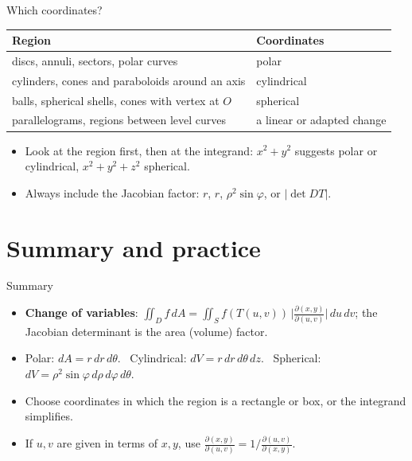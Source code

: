 \documentclass[10pt]{wosm-slides}
\newcommand{\dA}{\, dA}
\begin{document}
\begin{frame}{Which coordinates?}
  \begin{center}
    \begin{tabular}{@{}ll@{}}
      \toprule
      Region & Coordinates \\
      \midrule
      discs, annuli, sectors, polar curves & polar \\
      cylinders, cones and paraboloids around an axis & cylindrical \\
      balls, spherical shells, cones with vertex at $O$ & spherical \\
      parallelograms, regions between level curves & a linear or adapted change \\
      \bottomrule
    \end{tabular}
  \end{center}
  \pause
  \begin{itemize}
    \item Look at the region first, then at the integrand: $x^2 + y^2$ suggests polar or cylindrical,
      $x^2 + y^2 + z^2$ spherical.
    \item Always include the Jacobian factor: $r$, $r$, $\rho^2\sin\varphi$, or $|\det DT|$.
  \end{itemize}
\end{frame}

\section{Summary and practice}

\begin{frame}{Summary}
  \begin{itemize}
    \item \textbf{Change of variables}: $\iint_D f \dA = \iint_S f(T(u, v))\,
      \bigl|\frac{\partial(x, y)}{\partial(u, v)}\bigr|\, du\, dv$; the Jacobian determinant is the area
      (volume) factor.
    \item Polar: $dA = r\, dr\, d\theta$. \ Cylindrical: $dV = r\, dr\, d\theta\, dz$. \
      Spherical: $dV = \rho^2 \sin\varphi\, d\rho\, d\varphi\, d\theta$.
    \item Choose coordinates in which the region is a rectangle or box, or the integrand simplifies.
    \item If $u, v$ are given in terms of $x, y$, use $\frac{\partial(x, y)}{\partial(u, v)} = 1 \big/ \frac{\partial(u, v)}{\partial(x, y)}$.
  \end{itemize}
\end{frame}
\end{document}
